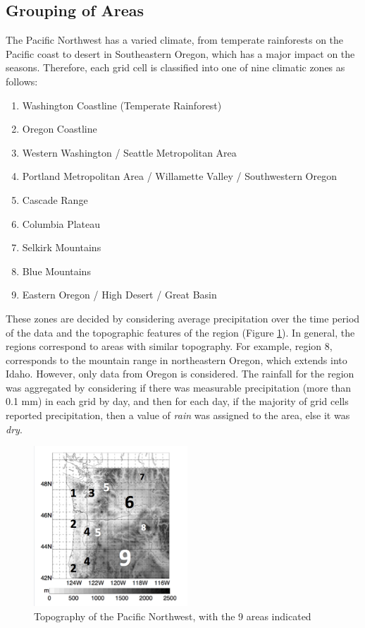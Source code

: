 \documentclass{article}
\begin{document}
\subsection{Grouping of Areas} \label{GroupArea}
The Pacific Northwest has a varied climate, from temperate rainforests on the Pacific coast to desert in Southeastern Oregon, which has a major impact on the seasons. Therefore, each grid cell is classified into one of nine climatic zones as follows:
\begin{enumerate}
\item Washington Coastline (Temperate Rainforest)
\item Oregon Coastline
\item Western Washington / Seattle Metropolitan Area
\item Portland Metropolitan Area / Willamette Valley / Southwestern Oregon
\item Cascade Range
\item Columbia Plateau
\item Selkirk Mountains
\item Blue Mountains
\item Eastern Oregon / High Desert / Great Basin
\end{enumerate}

These zones are decided by considering average precipitation over the time period of the data and the topographic features of the region (Figure \ref{fig:topo}). In general, the regions correspond to areas with similar topography. For example, region 8, corresponds to the mountain range in northeastern Oregon, which extends into Idaho. However, only data from Oregon is considered. The rainfall for the region was aggregated by considering if there was measurable precipitation (more than 0.1 mm) in each grid by day, and then for each day, if the majority of grid cells reported precipitation, then a value of \textit{rain} was assigned to the area, else it was \textit{dry}.


\begin{figure}[h!]
\centering
\includegraphics[width = .4\textwidth, height = 6cm]{LabledTopography}
\caption{Topography of the Pacific Northwest, with the 9 areas indicated }
\label{fig:topo}
\end{figure}
\end{document}
